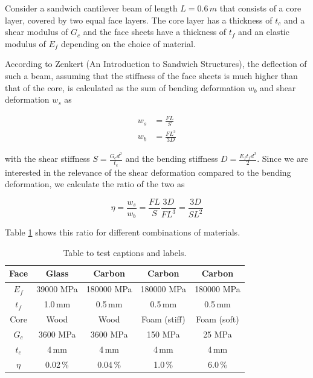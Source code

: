 Consider a sandwich cantilever beam of length $L = 0.6\,\unit{m}$ that consists of a core layer, covered by two equal face layers.
The core layer has a thickness of $t_c$ and a shear modulus of $G_c$ and the face sheets have a thickness of $t_f$ and an elastic modulus of $E_f$ depending on the choice of material.

According to Zenkert (An Introduction to Sandwich Structures), the deflection of such a beam, assuming that the stiffness of the face sheets is much higher than that of the core, is calculated as the sum of bending deformation $w_b$ and shear deformation $w_s$ as

\begin{align}
w_s &= \frac{FL}{S} \\
w_b &= \frac{FL^3}{3D}
\end{align}

with the shear stiffness $S = \frac{G_c d^2}{t_c}$ and the bending stiffness $D = \frac{E_f t_f d^2}{2}$.
Since we are interested in the relevance of the shear deformation compared to the bending deformation, we calculate the ratio of the two as

\begin{equation}
\eta = \frac{w_s}{w_b} = \frac{FL}{S}\frac{3D}{FL^3} = \frac{3D}{SL^2}
\end{equation}

Table \ref{tbl:material-shear-ratio} shows this ratio for different combinations of materials.

\begin{table}[h!]
\centering
\begin{tabular}{| c | c c c c |}
\hline
Face & Glass & Carbon & Carbon & Carbon \\
\hline
$E_f$ & 39000 MPa & 180000 MPa & 180000 MPa & 180000 MPa \\
$t_f$ & 1.0\,\unit{mm} & 0.5\,\unit{mm} & 0.5\,\unit{mm} & 0.5\,\unit{mm} \\
\hline
Core & Wood & Wood & Foam (stiff) & Foam (soft) \\
\hline
$G_c$ & 3600 MPa & 3600 MPa & 150 MPa & 25 MPa \\
$t_c$ & 4\,\unit{mm} & 4\,\unit{mm} & 4\,\unit{mm} & 4\,\unit{mm} \\
\hline
$\eta$ & 0.02\,\% & 0.04\,\% & 1.0\,\% & 6.0\,\% \\
\hline
\end{tabular}
\caption{Table to test captions and labels.}
\label{tbl:material-shear-ratio}
\end{table}

